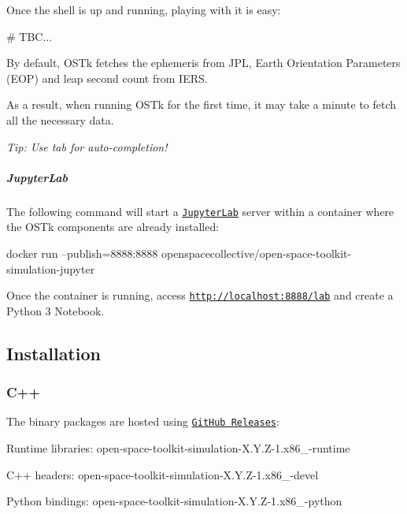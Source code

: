 Once the shell is up and running, playing with it is easy\+:


\begin{DoxyCode}
\textcolor{comment}{# TBC...}
\end{DoxyCode}


By default, O\+S\+Tk fetches the ephemeris from J\+PL, Earth Orientation Parameters (E\+OP) and leap second count from I\+E\+RS.

As a result, when running O\+S\+Tk for the first time, it may take a minute to fetch all the necessary data.

{\itshape Tip\+: Use tab for auto-\/completion!}

\subparagraph*{Jupyter\+Lab}

The following command will start a \href{https://jupyterlab.readthedocs.io/en/stable/}{\tt Jupyter\+Lab} server within a container where the O\+S\+Tk components are already installed\+:


\begin{DoxyCode}
docker run --publish=8888:8888 openspacecollective/open-space-toolkit-simulation-jupyter
\end{DoxyCode}


Once the container is running, access \href{http://localhost:8888/lab}{\tt http\+://localhost\+:8888/lab} and create a Python 3 Notebook.

\subsection*{Installation}

\subsubsection*{C++}

The binary packages are hosted using \href{https://github.com/open-space-collective/open-space-toolkit-simulation/releases}{\tt Git\+Hub Releases}\+:


\begin{DoxyItemize}
\item Runtime libraries\+: {\ttfamily open-\/space-\/toolkit-\/simulation-\/\+X.\+Y.\+Z-\/1.\+x86\+\_-\/runtime}
\item C++ headers\+: {\ttfamily open-\/space-\/toolkit-\/simulation-\/\+X.\+Y.\+Z-\/1.\+x86\+\_-\/devel}
\item Python bindings\+: {\ttfamily open-\/space-\/toolkit-\/simulation-\/\+X.\+Y.\+Z-\/1.\+x86\+\_-\/python}
\end{DoxyItemize}


